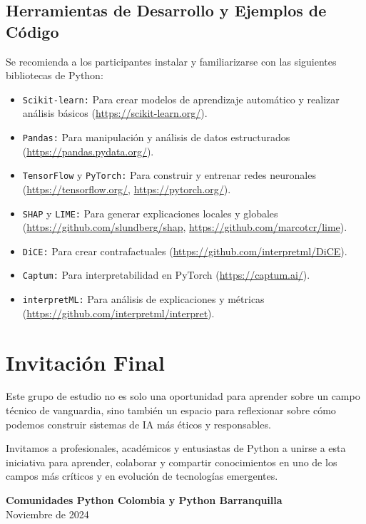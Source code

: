 \subsection*{Herramientas de Desarrollo y Ejemplos de Código}
Se recomienda a los participantes instalar y familiarizarse con las siguientes bibliotecas de Python:
\begin{itemize}
    \item \texttt{Scikit-learn:} Para crear modelos de aprendizaje automático y realizar análisis básicos (\url{https://scikit-learn.org/}).
    \item \texttt{Pandas:} Para manipulación y análisis de datos estructurados (\url{https://pandas.pydata.org/}).
    \item \texttt{TensorFlow} y \texttt{PyTorch:} Para construir y entrenar redes neuronales (\url{https://tensorflow.org/}, \url{https://pytorch.org/}).
    \item \texttt{SHAP} y \texttt{LIME:} Para generar explicaciones locales y globales (\url{https://github.com/slundberg/shap}, \url{https://github.com/marcotcr/lime}).
    \item \texttt{DiCE:} Para crear contrafactuales (\url{https://github.com/interpretml/DiCE}).
    \item \texttt{Captum:} Para interpretabilidad en PyTorch (\url{https://captum.ai/}).
    \item \texttt{interpretML:} Para análisis de explicaciones y métricas (\url{https://github.com/interpretml/interpret}).
\end{itemize}

\section*{Invitación Final}
Este grupo de estudio no es solo una oportunidad para aprender sobre un campo técnico de vanguardia, sino también un espacio para reflexionar sobre cómo podemos construir sistemas de IA más éticos y responsables. 

Invitamos a profesionales, académicos y entusiastas de Python a unirse a esta iniciativa para aprender, colaborar y compartir conocimientos en uno de los campos más críticos y en evolución de tecnologías emergentes.

\vspace{1cm}
\begin{flushright}
\textbf{Comunidades Python Colombia y Python Barranquilla} \\
\vspace{1cm}
Noviembre de 2024
\end{flushright}
